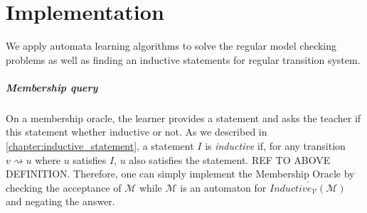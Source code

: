 \chapter{Implementation}\label{chapter:implementation}

We apply automata learning algorithms to solve the regular model checking problems
as well as finding an inductive statements for regular transition system.

\paragraph*{Membership query}
On a membership oracle, the learner provides a statement and asks the teacher if 
this statement whether inductive or not. As we described in \autoref{chapter:inductive_statement}, 
a statement $I$ is \textit{inductive} if, for any transition $v \rightsquigarrow u$
where $u$ satisfies $I$, $u$ also satisfies the statement.
REF TO ABOVE DEFINITION.
Therefore, one can simply implement the Membership Oracle by checking the acceptance 
of $\mathcal{M}$ while $\mathcal{M}$ is an automaton for 
$\overline{Inductive_{\mathcal{V}}(\mathcal{M})}$ and negating the answer.
